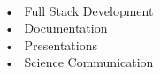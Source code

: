  \\[0.5em]
~•~ Full Stack Development\\~•~ Documentation\\~•~ Presentations\\~•~ Science
Communication